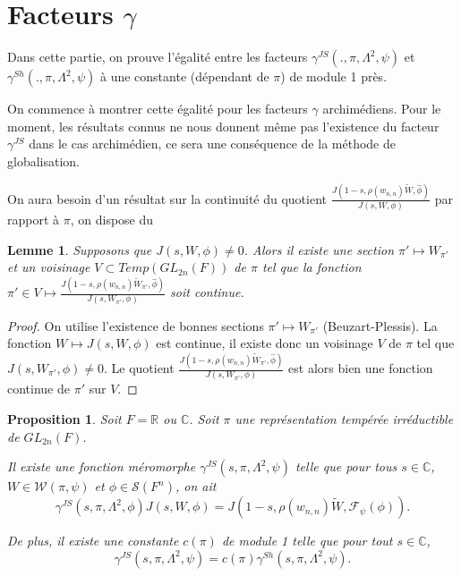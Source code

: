 \documentclass{amsart}
\newtheorem{proposition}{Proposition}[section]
\newtheorem{lemme}{Lemme}[section]
\begin{document}
 \section{Facteurs $\gamma$}
 
 Dans cette partie, on prouve l'égalité entre les facteurs $\gamma^{JS}(., \pi, \Lambda^2, \psi)$ et $\gamma^{Sh}(., \pi, \Lambda^2, \psi)$ à une constante (dépendant de $\pi$) de module 1 près.
 
 On commence à montrer cette égalité pour les facteurs $\gamma$ archimédiens. Pour le moment, les résultats connus ne nous donnent même pas l'existence du facteur $\gamma^{JS}$ dans le cas archimédien, ce sera une conséquence de la méthode de globalisation.
 
 On aura besoin d'un résultat sur la continuité du quotient $\frac{J(1-s, \rho(w_{n,n})\tilde{W}, \hat{\phi})}{J(s, W, \phi)}$ par rapport à $\pi$, on dispose du
 \begin{lemme}
 \label{cont}
 Supposons que $J(s, W, \phi) \neq 0$. Alors il existe une section $\pi' \mapsto W_{\pi'}$ et un voisinage $V \subset Temp(GL_{2n}(F))$ de $\pi$ tel que la fonction $\pi' \in V \mapsto \frac{J(1-s, \rho(w_{n,n})\tilde{W}_{\pi'}, \hat{\phi})}{J(s, W_{\pi'}, \phi)}$ soit continue.
 \end{lemme}
 
 \begin{proof}
 On utilise l'existence de bonnes sections $\pi' \mapsto W_{\pi'}$ (Beuzart-Plessis). La fonction $W \mapsto J(s, W, \phi)$ est continue, il existe donc un voisinage $V$ de $\pi$ tel que $J(s, W_{\pi'}, \phi) \neq 0$. Le quotient $\frac{J(1-s, \rho(w_{n,n})\tilde{W}_{\pi'}, \hat{\phi})}{J(s, W_{\pi'}, \phi)}$ est alors bien une fonction continue de $\pi'$ sur $V$. 
 \end{proof}
 
 \begin{proposition}
 \label{proparch}
 Soit $F = \mathbb{R}$ ou $\mathbb{C}$. Soit $\pi$ une représentation tempérée irréductible de $GL_{2n}(F)$. 
 
 Il existe une fonction méromorphe $\gamma^{JS}(s,\pi,\Lambda^2,\psi)$ telle que pour tous $s \in \mathbb{C}$, $W \in \mathcal{W}(\pi, \psi)$ et $\phi \in \mathcal{S}(F^n)$, on ait
 \begin{equation}
 \gamma^{JS}(s, \pi, \Lambda^2, \phi) J(s, W, \phi) = J(1-s, \rho(w_{n,n})\tilde{W}, \mathcal{F}_\psi(\phi)).
 \end{equation}
 
 De plus, il existe une constante $c(\pi)$ de module 1 telle que pour tout $s \in \mathbb{C}$,
 \begin{equation}
 \gamma^{JS}(s, \pi, \Lambda^2, \psi) = c(\pi)\gamma^{Sh}(s, \pi, \Lambda^2, \psi).
 \end{equation}
 \end{proposition}
 
\end{document}
